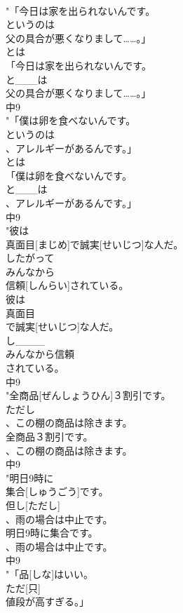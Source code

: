 \documentclass[8pt]{extreport}
\begin{document}
\begin{CJK}{UTF8}{min}
\\	"「今日は家を出られないんです。
\\	というのは
\\	父の具合が悪くなりまして……。」 
\\	とは
\\	「今日は家を出られないんです。
\\	と___は
\\	父の具合が悪くなりまして……。」
\\	中9
\\	"「僕は卵を食べないんです。
\\	というのは
\\	、アレルギーがあるんです。」 
\\	とは
\\	「僕は卵を食べないんです。
\\	と___は
\\	、アレルギーがあるんです。」
\\	中9
\\	"彼は
\\	真面目[まじめ]で誠実[せいじつ]な人だ。
\\	したがって
\\	みんなから
\\	信頼[しんらい]されている。
\\	彼は
\\	真面目
\\	で誠実[せいじつ]な人だ。
\\	し____
\\	みんなから信頼
\\	されている。
\\	中9
\\	"全商品[ぜんしょうひん]３割引です。
\\	ただし
\\	、この棚の商品は除きます。
\\	全商品３割引です。
\\	、この棚の商品は除きます。
\\	中9
\\	"明日9時に
\\	集合[しゅうごう]です。
\\	但し[ただし]
\\	、雨の場合は中止です。
\\	明日9時に集合です。
\\	、雨の場合は中止です。
\\	中9
\\	"「品[しな]はいい。
\\	ただ[只]
\\	値段が高すぎる。」

\end{CJK}
\end{document}
